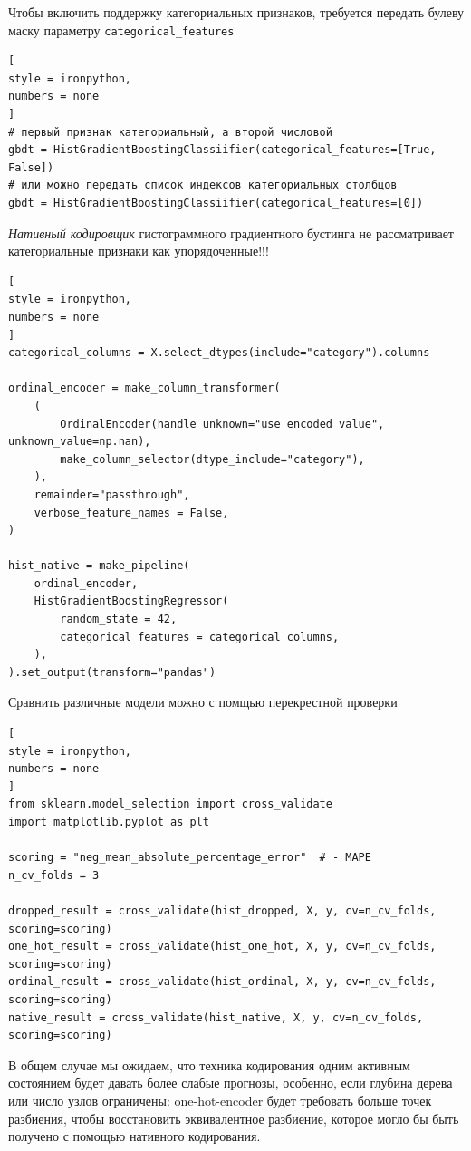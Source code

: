 \documentclass[%
	11pt,
	a4paper,
	utf8,
		]{article}
\begin{document}
Чтобы включить поддержку категориальных признаков, требуется передать булеву маску параметру \verb|categorical_features|
\begin{lstlisting}[
style = ironpython,
numbers = none
]
# первый признак категориальный, а второй числовой
gbdt = HistGradientBoostingClassiifier(categorical_features=[True, False])  
# или можно передать список индексов категориальных столбцов
gbdt = HistGradientBoostingClassiifier(categorical_features=[0])
\end{lstlisting}

\emph{Нативный кодировщик} гистограммного градиентного бустинга не рассматривает категориальные признаки как упорядоченные!!!
\begin{lstlisting}[
style = ironpython,
numbers = none
]
categorical_columns = X.select_dtypes(include="category").columns

ordinal_encoder = make_column_transformer(
    (
        OrdinalEncoder(handle_unknown="use_encoded_value", unknown_value=np.nan),
        make_column_selector(dtype_include="category"),
    ),
    remainder="passthrough",
    verbose_feature_names = False,
)

hist_native = make_pipeline(
    ordinal_encoder,
    HistGradientBoostingRegressor(
        random_state = 42,
        categorical_features = categorical_columns,
    ),
).set_output(transform="pandas")
\end{lstlisting}

Сравнить различные модели можно с помщью перекрестной проверки
\begin{lstlisting}[
style = ironpython,
numbers = none
]
from sklearn.model_selection import cross_validate
import matplotlib.pyplot as plt

scoring = "neg_mean_absolute_percentage_error"  # - MAPE
n_cv_folds = 3

dropped_result = cross_validate(hist_dropped, X, y, cv=n_cv_folds, scoring=scoring)
one_hot_result = cross_validate(hist_one_hot, X, y, cv=n_cv_folds, scoring=scoring)
ordinal_result = cross_validate(hist_ordinal, X, y, cv=n_cv_folds, scoring=scoring)
native_result = cross_validate(hist_native, X, y, cv=n_cv_folds, scoring=scoring)
\end{lstlisting}

В общем случае мы ожидаем, что техника кодирования одним активным состоянием будет давать более слабые прогнозы, особенно, если глубина дерева или число узлов ограничены: one-hot-encoder будет требовать больше точек разбиения, чтобы восстановить эквивалентное разбиение, которое могло бы быть получено с помощью нативного кодирования.
\end{document}
